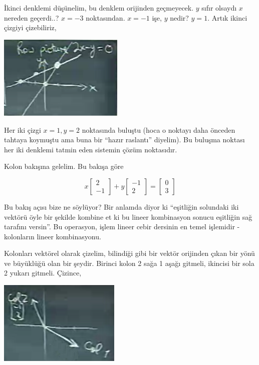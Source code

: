\documentclass[12pt,fleqn]{article}\usepackage{../../common}
\begin{document}
İkinci denklemi düşünelim, bu denklem orijinden geçmeyecek. $y$ sıfır
olsaydı $x$ nereden geçerdi..? $x=-3$ noktasından. $x=-1$ işe, $y$ nedir?
$y=1$. Artık ikinci çizgiyi çizebiliriz,

\includegraphics[height=4cm]{1_02.png}

Her iki çizgi $x=1,y=2$ noktasında buluştu (hoca o noktayı daha önceden
tahtaya koymuştu ama buna bir ``hazır raslantı'' diyelim). Bu buluşma
noktası her iki denklemi tatmin eden sistemin çözüm noktasıdır.

Kolon bakışına gelelim. Bu bakışa göre

$$ 
x
\left[\begin{array}{r}
2 \\
-1
\end{array}\right]
+
y
\left[\begin{array}{r}
-1 \\
2
\end{array}\right]
=
\left[\begin{array}{r}
0 \\
3
\end{array}\right]
$$

Bu bakış açısı bize ne söylüyor? Bir anlamda diyor ki ``eşitliğin solundaki
iki vektörü öyle bir şekilde kombine et ki bu lineer kombinasyon sonucu
eşitliğin sağ tarafını versin''. Bu operasyon, işlem lineer cebir dersinin
en temel işlemidir - kolonların lineer kombinasyonu. 

Kolonları vektörel olarak çizelim, bilindiği gibi bir vektör orijinden
çıkan bir yönü ve büyüklüğü olan bir şeydir. Birinci kolon 2 sağa 1 aşağı
gitmeli, ikincisi bir sola 2 yukarı gitmeli. Çizince,

\includegraphics[height=4cm]{1_03.png}
\end{document}
